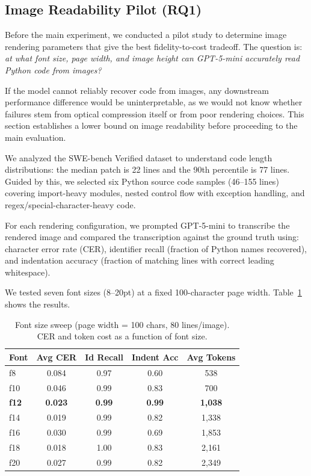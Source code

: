 \subsection{Image Readability Pilot (RQ1)}\label{sec:rendering-config}

Before the main experiment, we conducted a pilot study to determine image rendering parameters that give the best fidelity-to-cost tradeoff. The question is: \emph{at what font size, page width, and image height can GPT-5-mini accurately read Python code from images?}

If the model cannot reliably recover code from images, any downstream performance difference would be uninterpretable, as we would not know whether failures stem from optical compression itself or from poor rendering choices. This section establishes a lower bound on image readability before proceeding to the main evaluation.

We analyzed the SWE-bench Verified dataset to understand code length distributions: the median patch is 22 lines and the 90th percentile is 77 lines. Guided by this, we selected six Python source code samples (46--155 lines) covering import-heavy modules, nested control flow with exception handling, and regex/special-character-heavy code.

For each rendering configuration, we prompted GPT-5-mini to transcribe the rendered image and compared the transcription against the ground truth using: character error rate (CER), identifier recall (fraction of Python names recovered), and indentation accuracy (fraction of matching lines with correct leading whitespace).

We tested seven font sizes (8--20pt) at a fixed 100-character page width. Table~\ref{tab:fontsize-sweep} shows the results.

\begin{table}[t]
\centering
\caption{Font size sweep (page width = 100 chars, 80 lines/image). CER and token cost as a function of font size.}
\label{tab:fontsize-sweep}
\small
\begin{tabular}{lcccc}
\toprule
\textbf{Font} & \textbf{Avg CER} & \textbf{Id Recall} & \textbf{Indent Acc} & \textbf{Avg Tokens} \\
\midrule
f8   & 0.084 & 0.97 & 0.60 &  538 \\
f10  & 0.046 & 0.99 & 0.83 &  700 \\
\textbf{f12}  & \textbf{0.023} & \textbf{0.99} & \textbf{0.99} & \textbf{1{,}038} \\
f14  & 0.019 & 0.99 & 0.82 & 1{,}338 \\
f16  & 0.030 & 0.99 & 0.69 & 1{,}853 \\
f18  & 0.018 & 1.00 & 0.83 & 2{,}161 \\
f20  & 0.027 & 0.99 & 0.82 & 2{,}349 \\
\bottomrule
\end{tabular}
\end{table}

